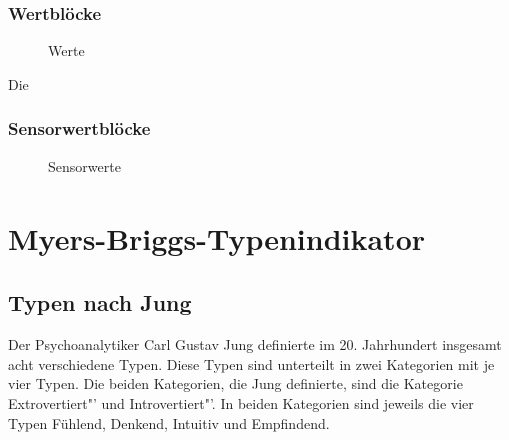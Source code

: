 \subsubsection{Wertblöcke}
\begin{figure}[htbp!]
	\centering
	\caption[Werte]{Werte} %
	\label{img:Werte}
\end{figure}

Die


\subsubsection{Sensorwertblöcke}
\begin{figure}[htbp!]
	\centering
	\caption[Sensorwerte]{Sensorwerte} %
	\label{img:Sensorwerte}
\end{figure}






\section{Myers-Briggs-Typenindikator\textsuperscript{\textregistered}} 
\subsection{Typen nach Jung}
Der Psychoanalytiker Carl Gustav Jung definierte im 20. Jahrhundert insgesamt acht verschiedene Typen. Diese Typen sind unterteilt in zwei Kategorien mit je vier Typen. Die beiden Kategorien, die Jung definierte, sind die Kategorie \glqq Extrovertiert"' und \glqq Introvertiert"'. In beiden Kategorien sind jeweils die vier Typen Fühlend, Denkend, Intuitiv und Empfindend. \cite{jung_1921}\\

